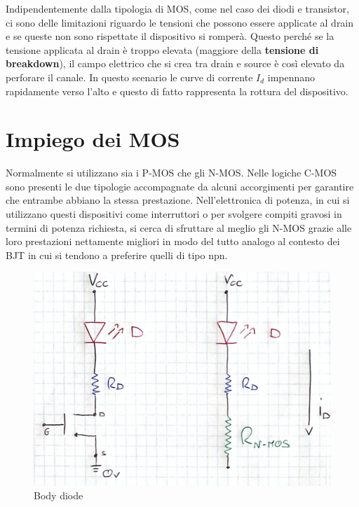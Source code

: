 \documentclass[12pt, a4paper]{report}
\begin{document}
Indipendentemente dalla tipologia di MOS, come nel caso dei diodi e transistor, ci sono delle limitazioni riguardo le tensioni che possono essere applicate al drain e se queste non sono rispettate il dispositivo si romperà. Questo perché se la tensione applicata al drain è troppo elevata (maggiore della \textbf{tensione di breakdown}), il campo elettrico che si crea tra drain e source è così elevato da perforare il canale. In questo scenario le curve di corrente $I_{d}$ impennano rapidamente verso l'alto e questo di fatto rappresenta la rottura del dispositivo.

\section{Impiego dei MOS}
Normalmente si utilizzano sia i P-MOS che gli N-MOS. Nelle logiche C-MOS sono presenti le due tipologie accompagnate da alcuni accorgimenti per garantire che entrambe abbiano la stessa prestazione. Nell'elettronica di potenza, in cui si utilizzano questi dispositivi come interruttori o per svolgere compiti gravosi in termini di potenza richiesta, si cerca di sfruttare al meglio gli N-MOS grazie alle loro prestazioni nettamente migliori in modo del tutto analogo al contesto dei BJT in cui si tendono a preferire quelli di tipo npn. 
\begin{figure}[h]
    \centering
    \includegraphics[scale=0.35,angle=0]{mos_interruttore.png}
    \caption{Body diode}
\end{figure}
\end{document}
